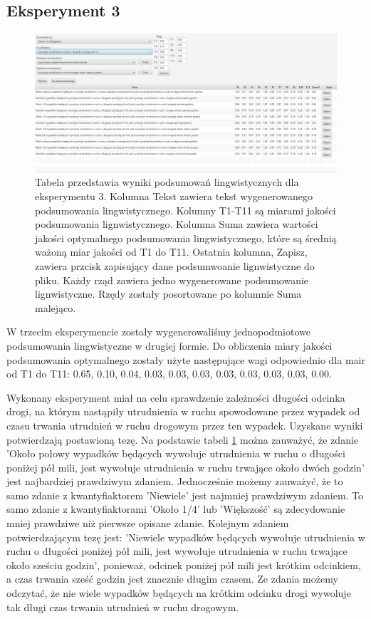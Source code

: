 \documentclass{classrep}
\begin{document}
\newpage
\subsection{Eksperyment 3}
\label{section:ex3}
\begin{figure}[h!]
 \centering
 \includegraphics[width=15cm]{ex3.png}
 \vspace{-0.3cm}
 \caption{Tabela przedstawia wyniki podsumowań lingwistycznych dla eksperymentu 3. Kolumna Tekst zawiera tekst wygenerowanego podsumowania lingwistycznego. Kolumny T1-T11 są miarami jakości podsumowania lignwistycznego\cite{niewiadomski19}. Kolumna Suma zawiera wartości jakości optymalnego podsumowania lingwistycznego, które są średnią ważoną miar jakości od T1 do T11. Ostatnia kolumna, Zapisz, zawiera przcisk zapisujący dane podsumwoanie lignwistyczne do pliku. Każdy rząd zawiera jedno wygenerowane podsumowanie lignwistyczne. Rzędy zostały posortowane po kolumnie Suma malejąco.  }
 \label{ex3}
\end{figure}

W trzecim eksperymencie zostały wygenerowaliśmy jednopodmiotowe podsumowania lingwistyczne w drugiej formie. Do obliczenia miary jakości podsumowania optymalnego zostały użyte następujące wagi odpowiednio dla mair od T1 do T11: 0.65, 0.10, 0.04, 0.03, 0.03, 0.03, 0.03, 0.03, 0.03, 0.03, 0.00. 

Wykonany eksperyment miał na celu sprawdzenie zależności długości odcinka drogi, na którym nastąpiły utrudnienia w ruchu spowodowane przez wypadek od czasu trwania utrudnień w ruchu drogowym przez ten wypadek. Uzyskane wyniki potwierdzają postawioną tezę. Na podstawie tabeli \ref{ex3} można zauważyć, że zdanie 'Około połowy wypadków będących wywołuje utrudnienia w ruchu o długości poniżej pół mili, jest wywołuje utrudnienia w ruchu trwające około dwóch godzin' jest najbardziej prawdziwym zdaniem. Jednocześnie możemy zauważyć, że to samo zdanie z kwantyfiaktorem 'Niewiele' jest najmniej prawdziwym zdaniem. To samo zdanie z kwantyfiaktorami 'Około 1/4' lub 'Większość' są zdecydowanie mniej prawdziwe niż pierwsze opisane zdanie. Kolejnym zdaniem potwierdzającym tezę jest: 'Niewiele wypadków będących wywołuje utrudnienia w ruchu o długości poniżej pół mili, jest wywołuje utrudnienia w ruchu trwające około sześciu godzin', ponieważ, odcinek poniżej pół mili jest krótkim odcinkiem, a czas trwania sześć godzin jest znacznie długim czasem. Ze zdania możemy odczytać, że nie wiele wypadków będących na krótkim odcinku drogi wywoluje tak długi czas trwania utrudnień w ruchu drogowym.
\end{document}
